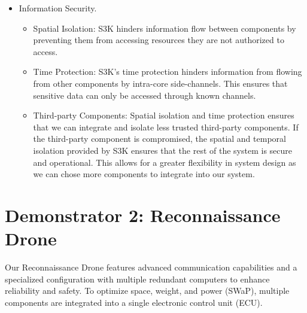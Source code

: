 \documentclass[a4paper,11pt]{article}
\begin{document}
\begin{itemize}
\begin{itemize}
			\end{itemize}
		\item Information Security.
			\begin{itemize}
				\item Spatial Isolation: 
					S3K hinders information flow between components by preventing them from accessing resources they are not authorized to access.
				\item Time Protection:
					S3K's time protection hinders information from flowing from other components by intra-core side-channels.
					This ensures that sensitive data can only be accessed through known channels.
				\item Third-party Components:
					Spatial isolation and time protection ensures that we can integrate and isolate less trusted third-party components.
					If the third-party component is compromised, the spatial and temporal isolation provided by S3K ensures that the rest of the system is secure and operational.
					This allows for a greater flexibility in system design as we can chose more components to integrate into our system.
			\end{itemize}
	\end{itemize}

	\newpage
	\section*{Demonstrator 2: Reconnaissance Drone}
	Our Reconnaissance Drone features advanced communication capabilities and a specialized configuration with multiple redundant computers to enhance reliability and safety. 
	To optimize space, weight, and power (SWaP), multiple components are integrated into a single electronic control unit (ECU).
\end{document}
